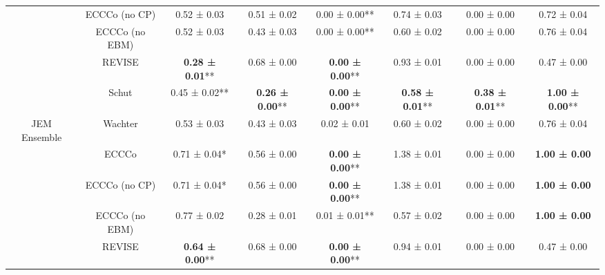 \begin{table}
{\begin{tabular}[t]{cccccccc}
 & ECCCo (no CP) & 0.52 ± 0.03\hphantom{*}\hphantom{*} & 0.51 ± 0.02\hphantom{*}\hphantom{*} & 0.00 ± 0.00** & 0.74 ± 0.03\hphantom{*}\hphantom{*} & 0.00 ± 0.00\hphantom{*}\hphantom{*} & 0.72 ± 0.04\hphantom{*}\hphantom{*}\\

 & ECCCo (no EBM) & 0.52 ± 0.03\hphantom{*}\hphantom{*} & 0.43 ± 0.03\hphantom{*}\hphantom{*} & 0.00 ± 0.00** & 0.60 ± 0.02\hphantom{*}\hphantom{*} & 0.00 ± 0.00\hphantom{*}\hphantom{*} & 0.76 ± 0.04\hphantom{*}\hphantom{*}\\

 & REVISE & \textbf{0.28 ± 0.01}** & 0.68 ± 0.00\hphantom{*}\hphantom{*} & \textbf{0.00 ± 0.00}** & 0.93 ± 0.01\hphantom{*}\hphantom{*} & 0.00 ± 0.00\hphantom{*}\hphantom{*} & 0.47 ± 0.00\hphantom{*}\hphantom{*}\\

 & Schut & 0.45 ± 0.02** & \textbf{0.26 ± 0.00}** & \textbf{0.00 ± 0.00}** & \textbf{0.58 ± 0.01}** & \textbf{0.38 ± 0.01}** & \textbf{1.00 ± 0.00}**\\

\multirow[t]{-6}{*}{\centering\arraybackslash JEM Ensemble} & Wachter & 0.53 ± 0.03\hphantom{*}\hphantom{*} & 0.43 ± 0.03\hphantom{*}\hphantom{*} & 0.02 ± 0.01\hphantom{*}\hphantom{*} & 0.60 ± 0.02\hphantom{*}\hphantom{*} & 0.00 ± 0.00\hphantom{*}\hphantom{*} & 0.76 ± 0.04\hphantom{*}\hphantom{*}\\
\cmidrule{1-8}
 & ECCCo & 0.71 ± 0.04*\hphantom{*} & 0.56 ± 0.00\hphantom{*}\hphantom{*} & \textbf{0.00 ± 0.00}** & 1.38 ± 0.01\hphantom{*}\hphantom{*} & 0.00 ± 0.00\hphantom{*}\hphantom{*} & \textbf{1.00 ± 0.00}\hphantom{*}\hphantom{*}\\

 & ECCCo (no CP) & 0.71 ± 0.04*\hphantom{*} & 0.56 ± 0.00\hphantom{*}\hphantom{*} & \textbf{0.00 ± 0.00}** & 1.38 ± 0.01\hphantom{*}\hphantom{*} & 0.00 ± 0.00\hphantom{*}\hphantom{*} & \textbf{1.00 ± 0.00}\hphantom{*}\hphantom{*}\\

 & ECCCo (no EBM) & 0.77 ± 0.02\hphantom{*}\hphantom{*} & 0.28 ± 0.01\hphantom{*}\hphantom{*} & 0.01 ± 0.01** & 0.57 ± 0.02\hphantom{*}\hphantom{*} & 0.00 ± 0.00\hphantom{*}\hphantom{*} & \textbf{1.00 ± 0.00}\hphantom{*}\hphantom{*}\\

 & REVISE & \textbf{0.64 ± 0.00}** & 0.68 ± 0.00\hphantom{*}\hphantom{*} & \textbf{0.00 ± 0.00}** & 0.94 ± 0.01\hphantom{*}\hphantom{*} & 0.00 ± 0.00\hphantom{*}\hphantom{*} & 0.47 ± 0.00\hphantom{*}\hphantom{*}\\


\end{tabular}}
\end{table}

